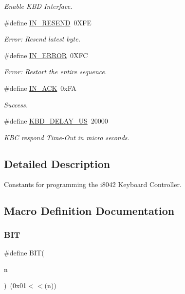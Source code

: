 \begin{DoxyCompactItemize}
$$\begin{DoxyCompactList}\small\item\em Enable K\+BD Interface. \end{DoxyCompactList}\item 
\#define \hyperlink{group__i8042_ga1cf5a4e33303a3893cc39b330319b1a0}{I\+N\+\_\+\+R\+E\+S\+E\+ND}~0\+X\+FE
\begin{DoxyCompactList}\small\item\em Error\+: Resend latest byte. \end{DoxyCompactList}\item 
\#define \hyperlink{group__i8042_ga975d13d25888550dcf4f69e5a6105cca}{I\+N\+\_\+\+E\+R\+R\+OR}~0\+X\+FC
\begin{DoxyCompactList}\small\item\em Error\+: Restart the entire sequence. \end{DoxyCompactList}\item 
\#define \hyperlink{group__i8042_ga91ac2ffa1978edadfaf6af64fb3e4faf}{I\+N\+\_\+\+A\+CK}~0x\+FA
\begin{DoxyCompactList}\small\item\em Success. \end{DoxyCompactList}\item 
\#define \hyperlink{group__i8042_ga66c64bf8a64b37d06bc7f788583f52ef}{K\+B\+D\+\_\+\+D\+E\+L\+A\+Y\+\_\+\+US}~20000
\begin{DoxyCompactList}\small\item\em K\+BC respond Time-\/\+Out in micro seconds. \end{DoxyCompactList}\end{DoxyCompactItemize}


\subsection{Detailed Description}
Constants for programming the i8042 Keyboard Controller. 

\subsection{Macro Definition Documentation}
\hypertarget{group__i8042_ga3a8ea58898cb58fc96013383d39f482c}{}\label{group__i8042_ga3a8ea58898cb58fc96013383d39f482c} 
\subsubsection{\texorpdfstring{B\+IT}{BIT}}
{\footnotesize\ttfamily \#define B\+IT(\begin{DoxyParamCaption}\item[{}]{n }\end{DoxyParamCaption})~(0x01$<$$<$(n))}

